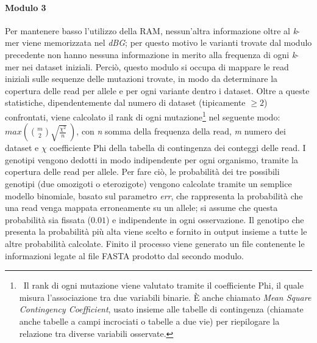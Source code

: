 \documentclass[../main.tex]{subfiles}
\begin{document}
\paragraph{Modulo 3} Per mantenere basso l'utilizzo della RAM, nessun'altra informazione oltre al \textit{k}-mer viene memorizzata nel \textit{dBG}; per questo motivo le varianti trovate dal modulo precedente non hanno nessuna informazione in merito alla frequenza di ogni \textit{k}-mer nei dataset iniziali. Perciò, questo modulo si occupa di mappare le read iniziali sulle sequenze delle mutazioni trovate, in modo da determinare la copertura delle read per allele e per ogni variante dentro i dataset. Oltre a queste statistiche, dipendentemente dal numero di dataset (tipicamente $\geq2$) confrontati, viene calcolato il rank di ogni mutazione\footnote{\ Il rank di ogni mutazione viene valutato tramite il coefficiente Phi, il quale misura l'associazione tra due variabili binarie. È anche chiamato \textit{Mean Square Contingency Coefficient}, usato insieme alle tabelle di contingenza (chiamate anche tabelle a campi incrociati o tabelle a due vie) per riepilogare la relazione tra diverse variabili osservate.} nel seguente modo: $max\left( \binom{m}{2}\sqrt{\frac{\chi^2}{n}}\ \right)$, con \textit{n} somma della frequenza della read, \textit{m} numero dei dataset e $\chi$ coefficiente Phi della tabella di contingenza dei conteggi delle read. I genotipi vengono dedotti in modo indipendente per ogni organismo, tramite la copertura delle read per allele. Per fare ciò, le probabilità dei tre possibili genotipi (due omozigoti o eterozigote) vengono calcolate tramite un semplice modello binomiale, basato sul parametro \textit{err}, che rappresenta la probabilità che una read venga mappata erroneamente su un allele; si assume che questa probabilità sia fissata ($0.01$) e indipendente in ogni osservazione. Il genotipo che presenta la probabilità più alta viene scelto e fornito in output insieme a tutte le altre probabilità calcolate. Finito il processo viene generato un file contenente le informazioni legate al file FASTA prodotto dal secondo modulo.

%
%
%
\end{document}
